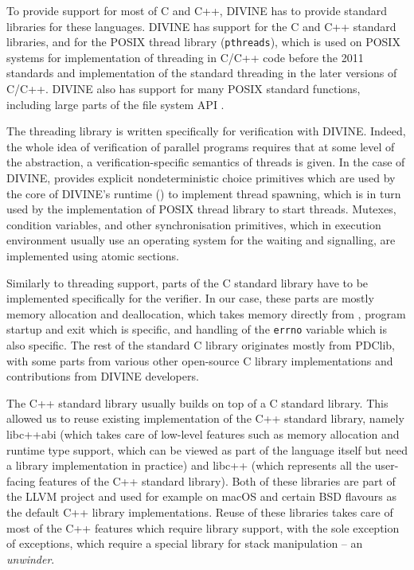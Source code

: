 To provide support for most of C and C++, DIVINE has to provide standard libraries for these languages.
DIVINE has support for the C and C++ standard libraries, and for the POSIX
thread library (\texttt{pthreads}), which is used on POSIX systems for
implementation of threading in C/C++ code before the 2011 standards and
implementation of the standard threading in the later versions of C/C++.
DIVINE also has support for many POSIX standard functions, including large parts of the file system API .

The threading library is written specifically for verification with DIVINE.
Indeed, the whole idea of verification of parallel programs requires that at some level of the abstraction, a verification-specific semantics of threads is given.
In the case of DIVINE, \divm provides explicit nondeterministic choice primitives which are used by the core of DIVINE's runtime (\dios) to implement thread spawning, which is in turn used by the implementation of POSIX thread library to start threads.
Mutexes, condition variables, and other synchronisation primitives, which in
execution environment usually use an operating system for the waiting and
signalling, are implemented using atomic sections.

Similarly to threading support, parts of the C standard library have to be
implemented specifically for the verifier.
In our case, these parts are mostly memory allocation and deallocation, which
takes memory directly from \divm, program startup and exit which is \dios specific, and handling of the \texttt{errno} variable which is also \dios specific.
The rest of the standard C library originates mostly from PDClib, with some parts from various other open-source C library implementations and contributions from DIVINE developers.

The C++ standard library usually builds on top of a C standard library.
This allowed us to reuse existing implementation of the C++ standard library,
namely libc++abi (which takes care of low-level features such as
memory allocation and runtime type support, which can be viewed as part of the
language itself but need a library implementation in practice) and
libc++ (which represents all the user-facing features of the C++
standard library).
Both of these libraries are part of the LLVM project and used for example on
macOS and certain BSD flavours as the default C++ library implementations.
Reuse of these libraries takes care of most of the C++ features which require
library support, with the sole exception of exceptions, which require a special
library for stack manipulation -- an \emph{unwinder}.

